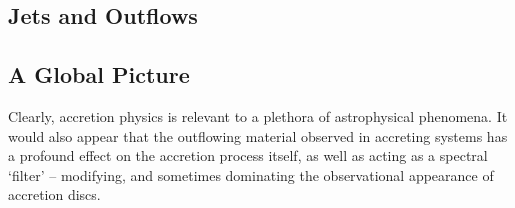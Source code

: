\subsection{Jets and Outflows}


\subsection{A Global Picture}

Clearly, accretion physics is relevant to a plethora of astrophysical phenomena. 
It would also appear that the outflowing material observed in accreting systems 
has a profound effect on the accretion process itself, as well as acting 
as a spectral `filter' -- modifying, and sometimes dominating the observational 
appearance of accretion discs.